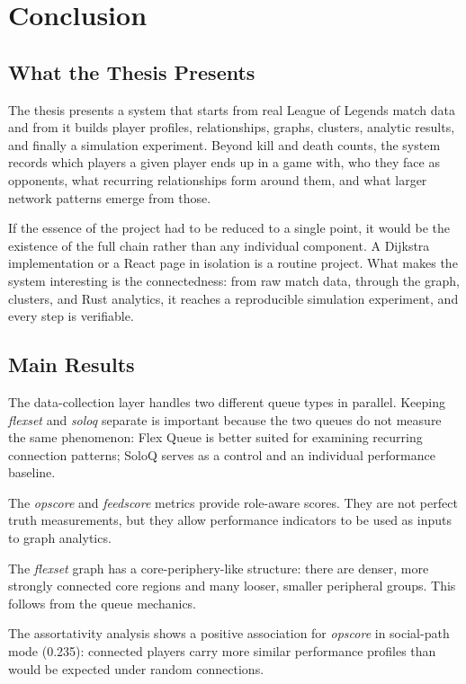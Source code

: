 \chapter{Conclusion}

\section{What the Thesis Presents}

The thesis presents a system that starts from real League of Legends match data and from it builds player profiles, relationships, graphs, clusters, analytic results, and finally a simulation experiment. Beyond kill and death counts, the system records which players a given player ends up in a game with, who they face as opponents, what recurring relationships form around them, and what larger network patterns emerge from those.

If the essence of the project had to be reduced to a single point, it would be the existence of the full chain rather than any individual component. A Dijkstra implementation or a React page in isolation is a routine project. What makes the system interesting is the connectedness: from raw match data, through the graph, clusters, and Rust analytics, it reaches a reproducible simulation experiment, and every step is verifiable.

\section{Main Results}

The data-collection layer handles two different queue types in parallel. Keeping \textit{flexset} and \textit{soloq} separate is important because the two queues do not measure the same phenomenon: Flex Queue is better suited for examining recurring connection patterns; SoloQ serves as a control and an individual performance baseline.

The \textit{opscore} and \textit{feedscore} metrics provide role-aware scores. They are not perfect truth measurements, but they allow performance indicators to be used as inputs to graph analytics.

The \textit{flexset} graph has a core-periphery-like structure: there are denser, more strongly connected core regions and many looser, smaller peripheral groups. This follows from the queue mechanics.

The assortativity analysis shows a positive association for \textit{opscore} in social-path mode (0.235): connected players carry more similar performance profiles than would be expected under random connections.


